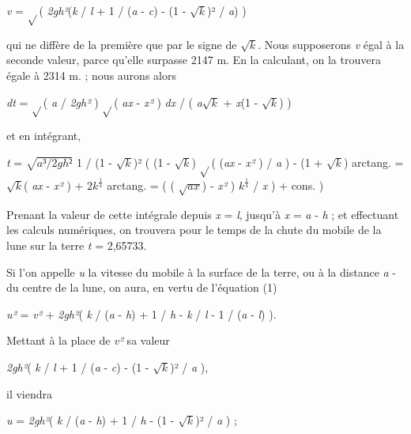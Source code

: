 \documentclass[a4paper, 11pt, oneside, polutonikogreek, french]{article}
\begin{document}
\begin{center}
\emph{v} = $\sqrt{}$( \emph{2gh²}(\emph{k} / \emph{l} + 1 / (\emph{a} - \emph{c}) - (1 - $\sqrt{k}$)² / \emph{a}) )
\end{center}

qui ne diffère de la première que par le signe de $\sqrt{k}$. Nous supposerons \emph{v} égal à la seconde valeur, parce qu'elle surpasse 2147 m. En la calculant, on la trouvera égale à 2314 m. ; nous aurons alors

\begin{center}
\emph{dt} = $\sqrt{}$( \emph{a} / \emph{2gh²} ) $\sqrt{}$( \emph{ax} - \emph{x²} ) \emph{dx} / ( \emph{a}$\sqrt{k}$ + \emph{x}(1 - $\sqrt{k}$) )
\end{center}

et en intégrant,

\begin{center}
\emph{t} = $\sqrt{a³ / 2gh²}$ 1 / (1 - $\sqrt{k}$)² ( (1 - $\sqrt{k}$) $\sqrt{}$( (\emph{ax} - \emph{x²} ) / \emph{a} ) - (1 + $\sqrt{k}$) arctang. = $\sqrt{k}$( \emph{ax} - \emph{x²} ) + $2k^{\frac{1}{4}}$ arctang. = ( ( $\sqrt{ax}$) - \emph{x²} ) $k^{\frac{1}{4}}$ / \emph{x} ) + cons. )
\end{center}

Prenant la valeur de cette intégrale depuis \emph{x} = \emph{l}, jusqu'à \emph{x} = \emph{a} - \emph{h} ; et effectuant les calculs numériques, on trouvera pour le temps de la chute du mobile de la lune sur la terre \emph{t} = 2,65733.

Si l'on appelle \emph{u} la vitesse du mobile à la surface de la terre, ou à la distance \emph{a} - du centre de la lune, on aura, en vertu de l'équation (1)

\begin{center}
\emph{u²} = \emph{v²} + \emph{2gh²}( \emph{k} / (\emph{a} - \emph{h}) + 1 / \emph{h} - \emph{k} / \emph{l} - 1 / (\emph{a} - \emph{l}) ).
\end{center}

Mettant à la place de \emph{v²} sa valeur

\begin{center}
\emph{2gh²}( \emph{k} / \emph{l} + 1 / (\emph{a} - \emph{c}) - (1 - $\sqrt{k}$)² / \emph{a} ),
\end{center}

il viendra

\begin{center}
\emph{u} = \emph{2gh²}( \emph{k} / (\emph{a} - \emph{h}) + 1 / \emph{h} - (1 - $\sqrt{k}$)² / \emph{a} ) ;
\end{center}
\end{document}
